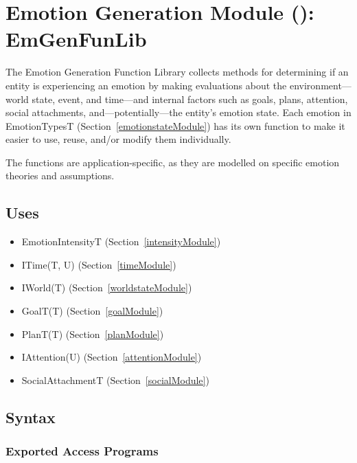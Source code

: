 \section{Emotion Generation Module ():
EmGenFunLib}\label{generateModule}

The Emotion Generation Function Library collects methods for determining if an
entity is experiencing an emotion by making evaluations about the
environment---world state, event, and time---and internal factors such as
goals, plans, attention, social attachments, and---potentially---the entity's
emotion state. Each emotion in EmotionTypesT (Section~\ref{emotionstateModule})
has its own function to make it easier to use, reuse, and/or modify them
individually.

The functions are application-specific, as they are modelled on specific
emotion theories and \progname{} assumptions.

\subsection{Uses}
\begin{itemize}[noitemsep, nosep]

    \item EmotionIntensityT (Section~\ref{intensityModule})

    \item ITime(T, U) (Section~\ref{timeModule})

    \item IWorld(T) (Section~\ref{worldstateModule})

    \item GoalT(T) (Section~\ref{goalModule})

    \item PlanT(T) (Section~\ref{planModule})

    \item IAttention(U) (Section~\ref{attentionModule})

    \item SocialAttachmentT (Section~\ref{socialModule})

\end{itemize}

\subsection{Syntax}

\subsubsection{Exported Access Programs}


